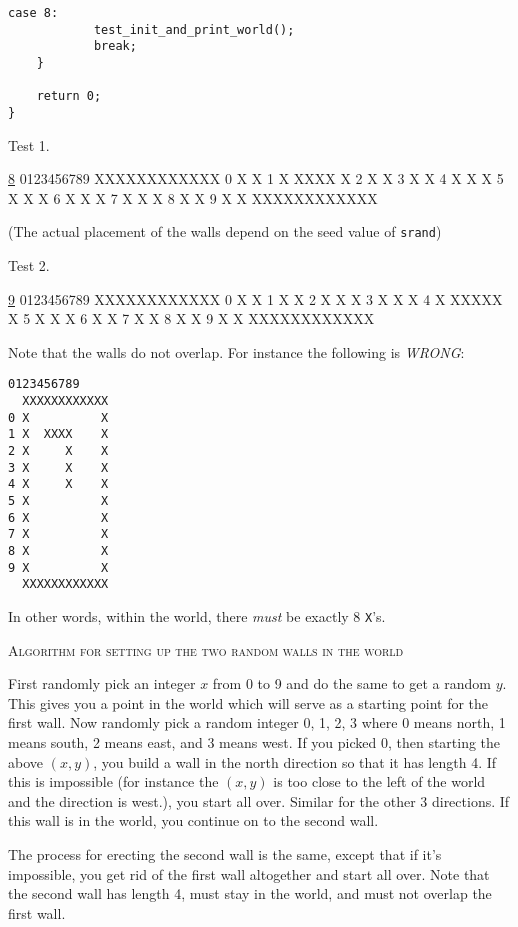 {{\begin{Verbatim}[frame=single]
        case 8:
            test_init_and_print_world();
            break;
    }
      
    return 0;
}
\end{Verbatim}
}

Test 1.
{\small
\begin{console}[commandchars=\\\{\}]
\underline{8}
   0123456789
  XXXXXXXXXXXX
0 X          X
1 X  XXXX    X
2 X          X
3 X          X
4 X      X   X
5 X      X   X
6 X      X   X
7 X      X   X
8 X          X
9 X          X
  XXXXXXXXXXXX
\end{console}
}
(The actual placement of the walls depend on the seed value of
\verb!srand!)

Test 2.
{\small
\begin{console}[commandchars=\\\{\}]
\underline{9}
  0123456789
  XXXXXXXXXXXX
0 X          X
1 X          X
2 X  X       X
3 X  X       X
4 X  XXXXX   X
5 X  X       X
6 X          X
7 X          X
8 X          X
9 X          X
  XXXXXXXXXXXX
\end{console}
}

Note that the walls do not overlap.
For instance the following is \textit{WRONG}:
\begin{Verbatim}[frame=single]
   0123456789
  XXXXXXXXXXXX
0 X          X
1 X  XXXX    X
2 X     X    X
3 X     X    X
4 X     X    X
5 X          X
6 X          X
7 X          X
8 X          X
9 X          X
  XXXXXXXXXXXX
\end{Verbatim}
In other words, within the world, there \textit{must} be exactly 8
\verb!X!'s.



\textsc{Algorithm for setting up the two random walls in the world}


First randomly pick an integer $x$ from 0 to 9 and do the same
to get a random $y$.
This gives you a point in the world which will serve
as a starting point for the
first wall.
Now randomly pick a random integer 0, 1, 2, 3
where 0 means north, 1 means south, 2 means east, and 3 means west.
If you picked 0, then starting the above $(x,y)$, you build a wall
in the north direction so that it has length 4.
If this is impossible (for instance the $(x,y)$ is too close to the
left of the world and the direction is west.), you start all over.
Similar for the other 3 directions.
If this wall is in the world, you continue on to the second wall.

The process for erecting the second wall is the same,
except that if it's impossible, you get rid of the first wall altogether
and start all over.
Note that the second wall has length 4, must stay in the world,
and must not overlap the first wall.



}
